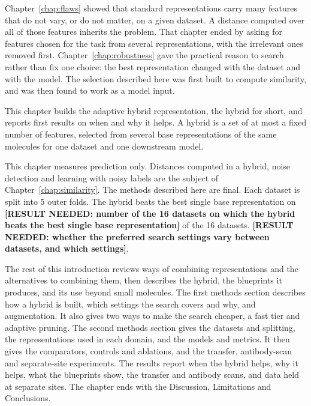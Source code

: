 Chapter~\ref{chap:flaws} showed that standard representations carry many features that do not vary, or do not matter, on a given dataset. A distance computed over all of those features inherits the problem. That chapter ended by asking for features chosen for the task from several representations, with the irrelevant ones removed first. Chapter~\ref{chap:robustness} gave the practical reason to search rather than fix one choice: the best representation changed with the dataset and with the model. The selection described here was first built to compute similarity, and was then found to work as a model input.

This chapter builds the adaptive hybrid representation, the hybrid for short, and reports first results on when and why it helps. A hybrid is a set of at most a fixed number of features, selected from several base representations of the same molecules for one dataset and one downstream model.

This chapter measures prediction only. Distances computed in a hybrid, noise detection and learning with noisy labels are the subject of Chapter~\ref{chap:similarity}. The methods described here are final. Each dataset is split into 5 outer folds. The hybrid beats the best single base representation on \textbf{[RESULT NEEDED: number of the 16 datasets on which the hybrid beats the best single base representation]} of the 16 datasets. \textbf{[RESULT NEEDED: whether the preferred search settings vary between datasets, and which settings]}.

The rest of this introduction reviews ways of combining representations and the alternatives to combining them, then describes the hybrid, the blueprints it produces, and its use beyond small molecules. The first methods section describes how a hybrid is built, which settings the search covers and why, and augmentation. It also gives two ways to make the search cheaper, a fast tier and adaptive pruning. The second methods section gives the datasets and splitting, the representations used in each domain, and the models and metrics. It then gives the comparators, controls and ablations, and the transfer, antibody-scan and separate-site experiments. The results report when the hybrid helps, why it helps, what the blueprints show, the transfer and antibody scans, and data held at separate sites. The chapter ends with the Discussion, Limitations and Conclusions.





